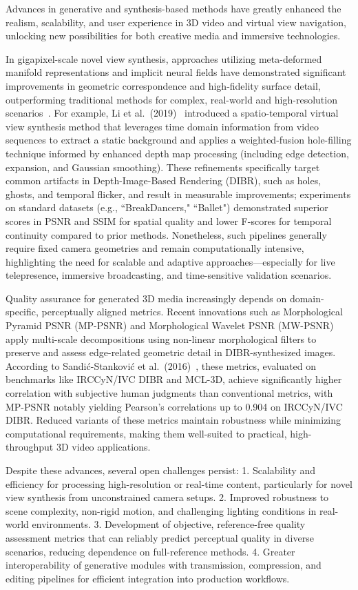 \documentclass[sigconf]{acmart}
\begin{document}
Advances in generative and synthesis-based methods have greatly enhanced the realism, scalability, and user experience in 3D video and virtual view navigation, unlocking new possibilities for both creative media and immersive technologies.

In gigapixel-scale novel view synthesis, approaches utilizing meta-deformed manifold representations and implicit neural fields have demonstrated significant improvements in geometric correspondence and high-fidelity surface detail, outperforming traditional methods for complex, real-world and high-resolution scenarios~\cite{ref98}. For example, Li et al.~(2019)~\cite{ref98} introduced a spatio-temporal virtual view synthesis method that leverages time domain information from video sequences to extract a static background and applies a weighted-fusion hole-filling technique informed by enhanced depth map processing (including edge detection, expansion, and Gaussian smoothing). These refinements specifically target common artifacts in Depth-Image-Based Rendering (DIBR), such as holes, ghosts, and temporal flicker, and result in measurable improvements; experiments on standard datasets (e.g., ``BreakDancers," ``Ballet") demonstrated superior scores in PSNR and SSIM for spatial quality and lower F-scores for temporal continuity compared to prior methods. Nonetheless, such pipelines generally require fixed camera geometries and remain computationally intensive, highlighting the need for scalable and adaptive approaches—especially for live telepresence, immersive broadcasting, and time-sensitive validation scenarios.

Quality assurance for generated 3D media increasingly depends on domain-specific, perceptually aligned metrics. Recent innovations such as Morphological Pyramid PSNR (MP-PSNR) and Morphological Wavelet PSNR (MW-PSNR)~\cite{ref99} apply multi-scale decompositions using non-linear morphological filters to preserve and assess edge-related geometric detail in DIBR-synthesized images. According to Sandić-Stanković et al.~(2016)~\cite{ref99}, these metrics, evaluated on benchmarks like IRCCyN/IVC DIBR and MCL-3D, achieve significantly higher correlation with subjective human judgments than conventional metrics, with MP-PSNR notably yielding Pearson's correlations up to 0.904 on IRCCyN/IVC DIBR. Reduced variants of these metrics maintain robustness while minimizing computational requirements, making them well-suited to practical, high-throughput 3D video applications.

Despite these advances, several open challenges persist:
1. Scalability and efficiency for processing high-resolution or real-time content, particularly for novel view synthesis from unconstrained camera setups.
2. Improved robustness to scene complexity, non-rigid motion, and challenging lighting conditions in real-world environments.
3. Development of objective, reference-free quality assessment metrics that can reliably predict perceptual quality in diverse scenarios, reducing dependence on full-reference methods.
4. Greater interoperability of generative modules with transmission, compression, and editing pipelines for efficient integration into production workflows.
\end{document}
